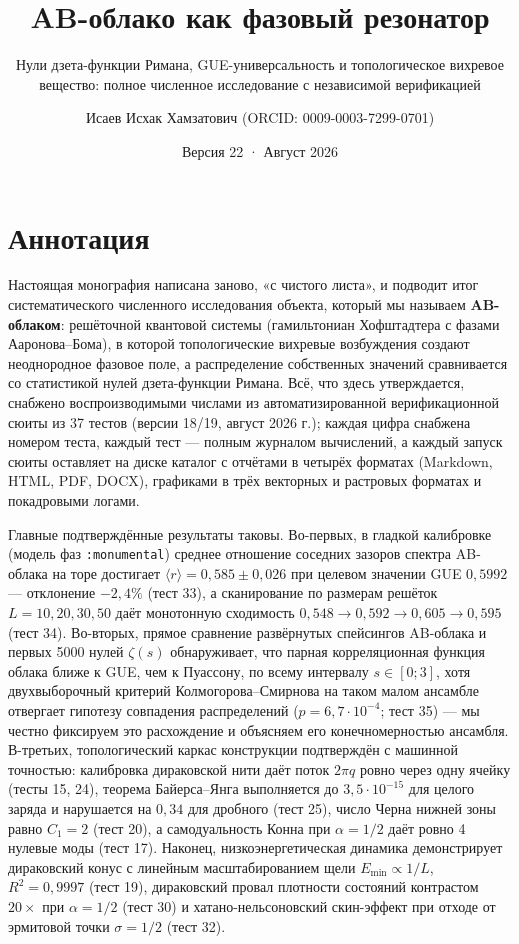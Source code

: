 \documentclass[
]{article}
\title{AB-облако как фазовый резонатор}
\subtitle{Нули дзета-функции Римана, GUE-универсальность и
топологическое вихревое вещество: полное численное исследование с
независимой верификацией}
\author{Исаев Исхак Хамзатович (ORCID: 0009-0003-7299-0701)}
\date{Версия 22 · Август 2026}
\begin{document}
\maketitle

\section{Аннотация}\label{ux430ux43dux43dux43eux442ux430ux446ux438ux44f}

Настоящая монография написана заново, «с чистого листа», и подводит итог
систематического численного исследования объекта, который мы называем
\textbf{AB-облаком}: решёточной квантовой системы (гамильтониан
Хофштадтера с фазами Ааронова--Бома), в которой топологические вихревые
возбуждения создают неоднородное фазовое поле, а распределение
собственных значений сравнивается со статистикой нулей дзета-функции
Римана. Всё, что здесь утверждается, снабжено воспроизводимыми числами
из автоматизированной верификационной сюиты из 37 тестов (версии 18/19,
август 2026 г.); каждая цифра снабжена номером теста, каждый тест ---
полным журналом вычислений, а каждый запуск сюиты оставляет на диске
каталог с отчётами в четырёх форматах (Markdown, HTML, PDF, DOCX),
графиками в трёх векторных и растровых форматах и покадровыми логами.

Главные подтверждённые результаты таковы. Во-первых, в гладкой
калибровке (модель фаз \texttt{:monumental}) среднее отношение соседних
зазоров спектра AB-облака на торе достигает
\(\langle r\rangle = 0{,}585\pm0{,}026\) при целевом значении GUE
\(0{,}5992\) --- отклонение \(-2{,}4\%\) (тест 33), а сканирование по
размерам решёток \(L=10,20,30,50\) даёт монотонную сходимость
\(0{,}548\to0{,}592\to0{,}605\to0{,}595\) (тест 34). Во-вторых, прямое
сравнение развёрнутых спейсингов AB-облака и первых 5000 нулей
\(\zeta(s)\) обнаруживает, что парная корреляционная функция облака
ближе к GUE, чем к Пуассону, по всему интервалу \(s\in[0;3]\), хотя
двухвыборочный критерий Колмогорова--Смирнова на таком малом ансамбле
отвергает гипотезу совпадения распределений (\(p=6{,}7\cdot10^{-4}\);
тест 35) --- мы честно фиксируем это расхождение и объясняем его
конечномерностью ансамбля. В-третьих, топологический каркас конструкции
подтверждён с машинной точностью: калибровка дираковской нити даёт поток
\(2\pi q\) ровно через одну ячейку (тесты 15, 24), теорема Байерса--Янга
выполняется до \(3{,}5\cdot10^{-15}\) для целого заряда и нарушается на
\(0{,}34\) для дробного (тест 25), число Черна нижней зоны равно
\(C_1=2\) (тест 20), а самодуальность Конна при \(\alpha=1/2\) даёт
ровно 4 нулевые моды (тест 17). Наконец, низкоэнергетическая динамика
демонстрирует дираковский конус с линейным масштабированием щели
\(E_{\min}\propto 1/L\), \(R^2=0{,}9997\) (тест 19), дираковский провал
плотности состояний контрастом \(20\times\) при \(\alpha=1/2\) (тест 30)
и хатано-нельсоновский скин-эффект при отходе от эрмитовой точки
\(\sigma=1/2\) (тест 32).
\end{document}
